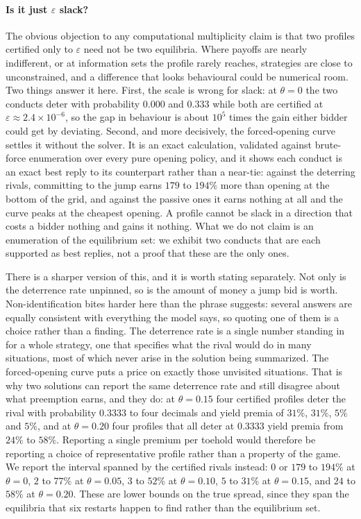 \documentclass[11pt,a4paper]{article}
\newcommand{\theold}{\theta}   %
\begin{document}
\paragraph{Is it just $\varepsilon$ slack?} The obvious objection to any computational multiplicity claim is that two profiles certified only to $\varepsilon$ need not be two equilibria. Where payoffs are nearly indifferent, or at information sets the profile rarely reaches, strategies are close to unconstrained, and a difference that looks behavioural could be numerical room. Two things answer it here. First, the scale is wrong for slack: at $\theold=0$ the two conducts deter with probability $0.000$ and $0.333$ while both are certified at $\varepsilon\approx2.4\times10^{-6}$, so the gap in behaviour is about $10^{5}$ times the gain either bidder could get by deviating. Second, and more decisively, the forced-opening curve settles it without the solver. It is an exact calculation, validated against brute-force enumeration over every pure opening policy, and it shows each conduct is an exact best reply to its counterpart rather than a near-tie: against the deterring rivals, committing to the jump earns $179$ to $194\%$ more than opening at the bottom of the grid, and against the passive ones it earns nothing at all and the curve peaks at the cheapest opening. A profile cannot be slack in a direction that costs a bidder nothing and gains it nothing. What we do not claim is an enumeration of the equilibrium set: we exhibit two conducts that are each supported as best replies, not a proof that these are the only ones.

There is a sharper version of this, and it is worth stating separately. Not only is the deterrence rate unpinned, so is the amount of money a jump bid is worth. Non-identification bites harder here than the phrase suggests: several answers are equally consistent with everything the model says, so quoting one of them is a choice rather than a finding. The deterrence rate is a single number standing in for a whole strategy, one that specifies what the rival would do in many situations, most of which never arise in the solution being summarized. The forced-opening curve puts a price on exactly those unvisited situations. That is why two solutions can report the same deterrence rate and still disagree about what preemption earns, and they do: at $\theold=0.15$ four certified profiles deter the rival with probability $0.3333$ to four decimals and yield premia of $31\%$, $31\%$, $5\%$ and $5\%$, and at $\theold=0.20$ four profiles that all deter at $0.3333$ yield premia from $24\%$ to $58\%$. Reporting a single premium per toehold would therefore be reporting a choice of representative profile rather than a property of the game. We report the interval spanned by the certified rivals instead: $0$ or $179$ to $194\%$ at $\theold=0$, $2$ to $77\%$ at $\theold=0.05$, $3$ to $52\%$ at $\theold=0.10$, $5$ to $31\%$ at $\theold=0.15$, and $24$ to $58\%$ at $\theold=0.20$. These are lower bounds on the true spread, since they span the equilibria that six restarts happen to find rather than the equilibrium set.
\end{document}

